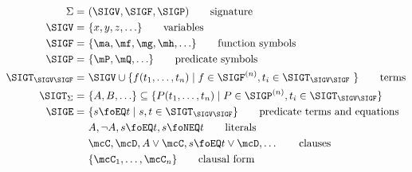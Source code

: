 
\begin{block}{}
	\vspace{-1em}
\begin{align*}
	\Sigma = &\ ( \SIGV, \SIGF, \SIGP)
	\tag*{signature}
	\\
	\SIGV = &\ \{ x,y,z,\ldots \}
	\tag*{variables}
	\\
	 \SIGF = &\ \{\ma,\mf,\mg,\mh,\ldots \}
	  \tag*{function symbols}
	  \\
	   \SIGP = &\ \{ \mP, \mQ, \ldots \} 
	   \tag*{predicate symbols}
	   \\
	   \SIGT_{\SIGV\SIGF} = &\ \SIGV \cup \{f(t_1,\ldots,t_n)
	   \mid f\in\SIGF^{(n)}, t_i\in\SIGT_{\SIGV\SIGF}\ \}
	   \tag*{terms}
	   \\
	   \SIGT_{\Sigma} = &\ \{A, B, \ldots\}  \subseteq \{ P ( t_1, \ldots, t_n )
	   \mid P\in\SIGP^{(n)}, t_i\in \SIGT_{\SIGV\SIGF}
	   \}
	   \\
	   \SIGE = &\ \{ s\foEQ t\mid s,t\in \SIGT_{\SIGV\SIGF} \}
	   \tag*{predicate terms and equations}
	   \\
	   &\ A, \lnot A, s\foEQ t, s\foNEQ t 
	   \tag*{literals}
	   \\
	   &\ \mcC, \mcD, A\lor\mcC, s\foEQ t \lor \mcD, \ldots
	   \tag*{clauses}
	   \\
	   &\ \{ \mcC_1, \ldots, \mcC_n \}
	   \tag*{clausal form}
\end{align*}
\end{block}






